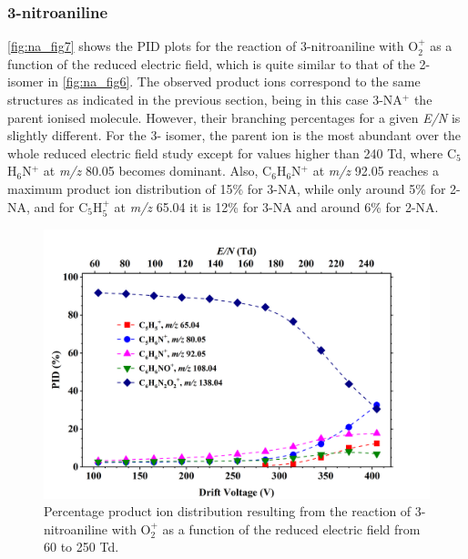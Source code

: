 \subsubsection{3-nitroaniline}
\autoref{fig:na_fig7} shows the PID plots for the reaction of 3-nitroaniline with O$_2^+$ as a function of the reduced electric field, which is quite similar to that of the 2- isomer in \autoref{fig:na_fig6}.
The observed product ions correspond to the same structures as indicated in the previous section, being in this case 3-NA$^+$ the parent ionised molecule.
However, their branching percentages for a given \textit{E/N} is slightly different.
For the 3- isomer, the parent ion is the most abundant over the whole reduced electric field study except for values higher than 240 Td, where C$_5$H$_6$N$^+$ at \textit{m/z} 80.05 becomes dominant.
Also, C$_6$H$_6$N$^+$ at \textit{m/z} 92.05 reaches a maximum product ion distribution of 15\% for 3-NA, while only around 5\% for 2-NA, and for C$_5$H$_5^+$ at \textit{m/z} 65.04 it is 12\% for 3-NA and around 6\% for 2-NA.


\begin{figure}%
\centering
\includegraphics[height=0.35\textheight]{pics/nitros_paper_7.png}
\caption{Percentage product ion distribution resulting from the reaction of 3-nitroaniline with O$_2^+$ as a function of the reduced electric field from 60 to 250 Td.}
\label{fig:na_fig7}
\end{figure}


